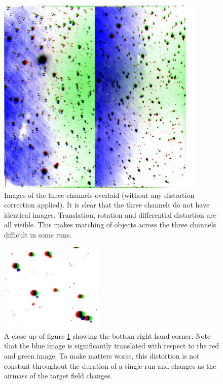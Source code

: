 \begin{figure}
  \centering
  \includegraphics[width=100mm]{images/overlay_multiply.png}
  \caption{Images of the three channels overlaid (without any distortion correction applied). It is clear that the three channels do not have identical images. Translation, rotation and differential distortion are all visible. This makes matching of objects across the three channels difficult in some runs. }
\label{fig:nonoverlap}
\end{figure}



\begin{figure}
  \centering
  \includegraphics[width=50mm]{images/overlay_multiply_closeup.png}
  \caption{A close up of figure \ref{fig:nonoverlap} showing the bottom right hand corner. Note that the blue image is significantly translated with respect to the red and green image. To make matters worse, this distortion is not constant throughout the duration of a single run and changes as the airmass of the target field changes.}
\label{fig:nonoverlapzoom}
\end{figure}

